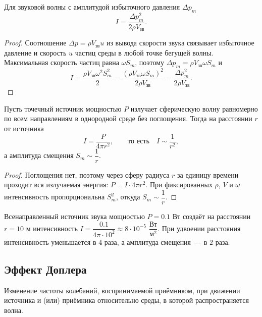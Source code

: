 \documentclass[12pt]{article}
\begin{document}
	\begin{corollary}
		Для звуковой волны с амплитудой избыточного давления $\varDelta p_m$
		\[
			I = \dfrac{\varDelta p_m^2}{2\rho V_{\text{зв}}}.
		\]
	\end{corollary}
	\begin{proof}
		Соотношение $\varDelta p = \rho V_{\text{зв}} u$ из вывода скорости звука связывает избыточное давление и скорость $u$ частиц среды в любой точке бегущей волны. Максимальная скорость частиц равна $\omega S_m$, поэтому $\varDelta p_m = \rho V_{\text{зв}} \omega S_m$ и
		\[
			I = \dfrac{\rho V_{\text{зв}} \omega^2 S_m^2}{2} = \dfrac{(\rho V_{\text{зв}} \omega S_m)^2}{2\rho V_{\text{зв}}} = \dfrac{\varDelta p_m^2}{2\rho V_{\text{зв}}}.
		\]
	\end{proof}

	\begin{statement}
		Пусть точечный источник мощностью $P$ излучает сферическую волну равномерно по всем направлениям в однородной среде без поглощения. Тогда на расстоянии $r$ от источника
		\[
			I = \dfrac{P}{4\pi r^2}, \qquad \text{то есть} \quad I \sim \dfrac{1}{r^2},
		\]
		а амплитуда смещения $S_m \sim \dfrac{1}{r}$.
	\end{statement}
	\begin{proof}
		Поглощения нет, поэтому через сферу радиуса $r$ за единицу времени проходит вся излучаемая энергия: $P = I \cdot 4\pi r^2$. При фиксированных $\rho$, $V$ и $\omega$ интенсивность пропорциональна $S_m^2$, откуда $S_m \sim \dfrac{1}{r}$.
	\end{proof}

	\begin{example}
		Всенаправленный источник звука мощностью $P = 0.1$ Вт создаёт на расстоянии $r = 10$ м интенсивность $I = \dfrac{0.1}{4\pi \cdot 10^2} \approx 8 \cdot 10^{-5}$ $\dfrac{\text{Вт}}{\text{м}^2}$. При удвоении расстояния интенсивность уменьшается в $4$ раза, а амплитуда смещения~--- в $2$ раза.
	\end{example}

		\subsection{Эффект Доплера}

	\begin{definition}
		Изменение частоты колебаний, воспринимаемой приёмником, при движении источника и (или) приёмника относительно среды, в которой распространяется волна.
	\end{definition}
\end{document}
